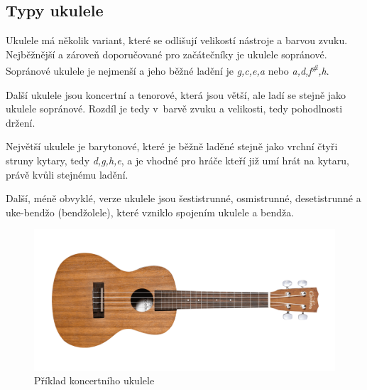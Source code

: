 \subsection{Typy ukulele}
Ukulele má několik variant, které se odlišují velikostí nástroje a barvou zvuku. Nejběžnější a zároveň doporučované pro začátečníky je ukulele sopránové. Sopránové ukulele je nejmenší a jeho běžné ladění je \textit{g,c,e,a} nebo \textit{a,d,f\textsuperscript{\#},h}.

Další ukulele jsou koncertní a tenorové, která jsou větší, ale ladí se stejně jako ukulele sopránové. Rozdíl je tedy v~barvě zvuku a velikosti, tedy pohodlnosti držení.

Největší ukulele je barytonové, které je běžně laděné stejně jako vrchní čtyři struny kytary, tedy \textit{d,g,h,e}, a je vhodné pro hráče kteří již umí hrát na kytaru, právě kvůli stejnému ladění.

Další, méně obvyklé, verze ukulele jsou šestistrunné, osmistrunné, desetistrunné a uke-bendžo (bendžolele), které vzniklo spojením ukulele a bendža.

\begin{figure}
    \centering
    \includegraphics[width=\textwidth]{assets/ukulele.png}
    \caption[Příklad koncertního ukulele]{Příklad koncertního ukulele~\cite{cordobaguitars_2020_ukulele}}
    \label{fig:ukulele_image}
\end{figure}